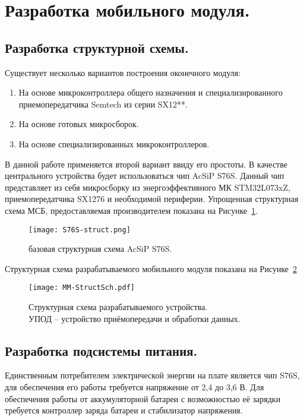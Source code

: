 \section{Разработка мобильного модуля.}
\subsection{Разработка структурной схемы.}

Существует несколько вариантов построения оконечного модуля:
\begin{enumerate}
	\item На основе микроконтроллера общего назначения и специализированного приемопередатчика  Semtech из серии SX12**.
	\item На основе готовых микросборок.
	\item На основе специализированных микроконтроллеров.
\end{enumerate}

\justifying В данной работе применяется второй вариант ввиду его простоты. В качестве центрального устройства будет использоваться чип AcSiP S76S. Данный чип представляет из себя микросборку из энергоэффективного МК \linebreak STM32L073xZ, приемопередатчика SX1276 и необходимой периферии. Упрощенная структурная схема МСБ, предоставляемая производителем показана на Рисунке~\ref{fig:S76S-struct}.

\begin{figure}[H]
	\centering
	\texttt{[image: S76S-struct.png]}
	\caption{базовая структурная схема AcSiP S76S.}%
	\label{fig:S76S-struct}
\end{figure}

Структурная схема разрабатываемого мобильного модуля показана на Рисунке~\ref{fig:MM-StructSch}

\begin{figure}[H]
	\centering
	\texttt{[image: MM-StructSch.pdf]}
	\caption{Структурная схема разрабатываемого устройства.\\ УПОД – устройство приёмопередачи и обработки данных.}%
	\label{fig:MM-StructSch}
\end{figure}

\subsection{Разработка подсистемы питания.}

Единственным потребителем электрической энергии на плате является чип S76S, для обеспечения его работы требуется напряжение от 2,4 до 3,6 В. Для обеспечения работы от аккумуляторной батареи с возможностью её зарядки требуется контроллер заряда батареи и стабилизатор напряжения. 


